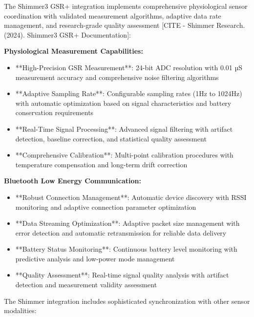 \documentclass[12pt,a4paper]{article}
\begin{document}
The Shimmer3 GSR+ integration implements comprehensive physiological sensor coordination with validated measurement
algorithms, adaptive data rate management, and research-grade quality
assessment [CITE - Shimmer Research. (2024). Shimmer3 GSR+ Documentation]:

\textbf{Physiological Measurement Capabilities:}

\begin{itemize}
\item **High-Precision GSR Measurement**: 24-bit ADC resolution with 0.01 µS measurement accuracy and comprehensive noise
  filtering algorithms
\item **Adaptive Sampling Rate**: Configurable sampling rates (1Hz to 1024Hz) with automatic optimization based on signal
  characteristics and battery conservation requirements
\item **Real-Time Signal Processing**: Advanced signal filtering with artifact detection, baseline correction, and
  statistical quality assessment
\item **Comprehensive Calibration**: Multi-point calibration procedures with temperature compensation and long-term drift
  correction

\end{itemize}
\textbf{Bluetooth Low Energy Communication:}

\begin{itemize}
\item **Robust Connection Management**: Automatic device discovery with RSSI monitoring and adaptive connection parameter
  optimization
\item **Data Streaming Optimization**: Adaptive packet size management with error detection and automatic retransmission for
  reliable data delivery
\item **Battery Status Monitoring**: Continuous battery level monitoring with predictive analysis and low-power mode
  management
\item **Quality Assessment**: Real-time signal quality analysis with artifact detection and measurement validity assessment

\end{itemize}
The Shimmer integration includes sophisticated synchronization with other sensor modalities:
\end{document}
